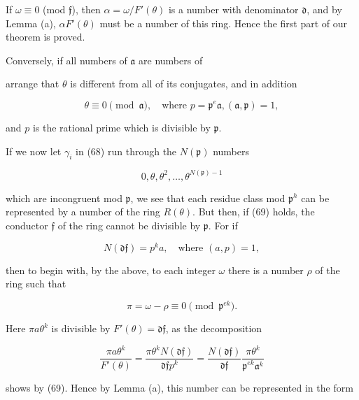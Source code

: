If $\omega \equiv 0$ (mod $\mathfrak{f}$), then $\alpha = \omega/F'(\theta)$ is a number with denominator $\mathfrak{d}$, and by Lemma (a), $\alpha F'(\theta)$ must be a number of this ring. Hence the first part of our theorem is proved.

Conversely, if all numbers of $\mathfrak{a}$ are numbers of

arrange that $\theta$ is different from all of its conjugates, and in addition

$$\theta \equiv 0 \pmod{\mathfrak{a}}, \quad \text{where } p = \mathfrak{p}^e \mathfrak{a}, (\mathfrak{a}, \mathfrak{p}) = 1,$$

and $p$ is the rational prime which is divisible by $\mathfrak{p}$.

If we now let $\gamma_i$ in (68) run through the $N(\mathfrak{p})$ numbers

$$0, \theta, \theta^2, \ldots, \theta^{N(\mathfrak{p})-1}$$

which are incongruent mod $\mathfrak{p}$, we see that each residue class mod $\mathfrak{p}^h$ can be represented by a number of the ring $R(\theta)$. But then, if (69) holds, the conductor $\mathfrak{f}$ of the ring cannot be divisible by $\mathfrak{p}$. For if

$$N(\mathfrak{d}\mathfrak{f}) = p^k a, \quad \text{where } (a, p) = 1,$$

then to begin with, by the above, to each integer $\omega$ there is a number $\rho$ of the ring such that

$$\pi = \omega - \rho \equiv 0 \pmod{\mathfrak{p}^{ek}}.$$

Here $\pi a\theta^k$ is divisible by $F'(\theta) = \mathfrak{d}\mathfrak{f}$, as the decomposition

$$\frac{\pi a\theta^k}{F'(\theta)} = \frac{\pi\theta^k N(\mathfrak{d}\mathfrak{f})}{\mathfrak{d}\mathfrak{f}p^k} = \frac{N(\mathfrak{d}\mathfrak{f})}{\mathfrak{d}\mathfrak{f}} \frac{\pi\theta^k}{\mathfrak{p}^{ek}\mathfrak{a}^k}$$

shows by (69). Hence by Lemma (a), this number can be represented in the form

$$\
